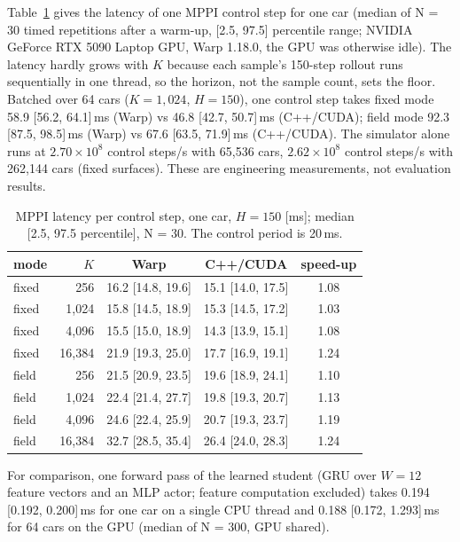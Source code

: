 Table~\ref{tab:compute} gives the latency of one MPPI control step for one car (median of N = 30 timed repetitions after a warm-up, [2.5, 97.5] percentile range; NVIDIA GeForce RTX 5090 Laptop GPU, Warp 1.18.0, the GPU was otherwise idle). The latency hardly grows with $K$ because each sample's 150-step rollout runs sequentially in one thread, so the horizon, not the sample count, sets the floor. Batched over 64 cars ($K = 1,024$, $H = 150$), one control step takes fixed mode 58.9 [56.2, 64.1]\,ms (Warp) vs 46.8 [42.7, 50.7]\,ms (C++/CUDA); field mode 92.3 [87.5, 98.5]\,ms (Warp) vs 67.6 [63.5, 71.9]\,ms (C++/CUDA). The simulator alone runs at $2.70\times10^{8}$ control steps/s with 65,536 cars, $2.62\times10^{8}$ control steps/s with 262,144 cars (fixed surfaces). These are engineering measurements, not evaluation results.

\begin{table}[t]\centering\small
\caption{MPPI latency per control step, one car, $H = 150$ [ms]; median [2.5, 97.5 percentile], N = 30. The control period is 20\,ms.}\label{tab:compute}
\begin{tabular}{lrccc}\toprule
mode & $K$ & Warp & C++/CUDA & speed-up \\\midrule
fixed & 256 & 16.2 [14.8, 19.6] & 15.1 [14.0, 17.5] & 1.08 \\
fixed & 1,024 & 15.8 [14.5, 18.9] & 15.3 [14.5, 17.2] & 1.03 \\
fixed & 4,096 & 15.5 [15.0, 18.9] & 14.3 [13.9, 15.1] & 1.08 \\
fixed & 16,384 & 21.9 [19.3, 25.0] & 17.7 [16.9, 19.1] & 1.24 \\
field & 256 & 21.5 [20.9, 23.5] & 19.6 [18.9, 24.1] & 1.10 \\
field & 1,024 & 22.4 [21.4, 27.7] & 19.8 [19.3, 20.7] & 1.13 \\
field & 4,096 & 24.6 [22.4, 25.9] & 20.7 [19.3, 23.7] & 1.19 \\
field & 16,384 & 32.7 [28.5, 35.4] & 26.4 [24.0, 28.3] & 1.24 \\
\bottomrule\end{tabular}\end{table}
For comparison, one forward pass of the learned student (GRU over $W = 12$ feature vectors and an MLP actor; feature computation excluded) takes 0.194 [0.192, 0.200]\,ms for one car on a single CPU thread and 0.188 [0.172, 1.293]\,ms for 64 cars on the GPU (median of N = 300, GPU shared).
